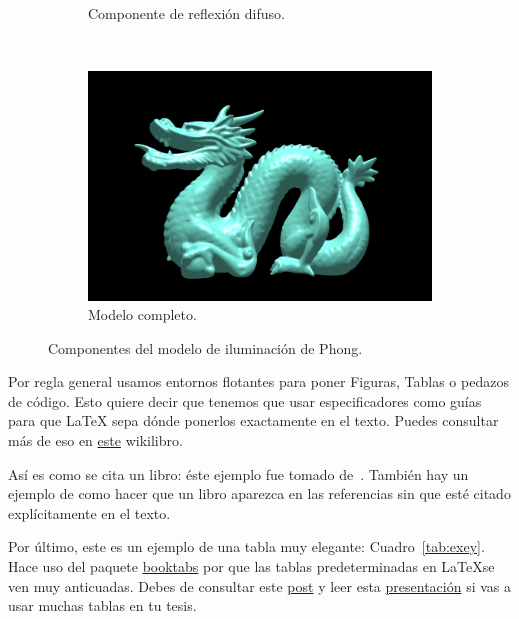 \begin{figure}[htp]
\begin{subfigure}[b]{0.45\textwidth}
   \caption{Componente de reflexión difuso.}
   \label{fig:2c}
 \end{subfigure}
~
 \begin{subfigure}[b]{0.45\textwidth}
   \includegraphics[width=\textwidth]{img/cap02/completo}
   \caption{Modelo completo.}
   \label{fig:2d}
 \end{subfigure}
 \caption[Modelo de iluminación de Phong]{Componentes del modelo de iluminación de Phong.}
 \label{fig:two}
\end{figure}

Por regla general usamos entornos flotantes para poner Figuras, Tablas o pedazos de código.
Esto quiere decir que tenemos que usar especificadores como guías para que \LaTeX{} sepa dónde ponerlos exactamente en el texto.
Puedes consultar más de eso en \href{https://en.wikibooks.org/wiki/LaTeX/Floats,_Figures_and_Captions}{este} wikilibro.

Así es como se cita un libro: éste ejemplo fue tomado de~\cite{Gonzalez:ImagenesDigitales}.
También hay un ejemplo de como hacer que un libro aparezca en las referencias sin que esté citado explícitamente en el texto.

Por último, este es un ejemplo de una tabla muy elegante: Cuadro~\ref{tab:exey}.
Hace uso del paquete \href{https://ctan.org/pkg/booktabs}{booktabs} por que las tablas predeterminadas en \LaTeX se ven muy anticuadas.
Debes de consultar este \href{https://jdhao.github.io/2019/08/27/latex_table_with_booktabs/}{post} y leer esta \href{https://people.inf.ethz.ch/markusp/teaching/guides/guide-tables.pdf}{presentación} si vas a usar muchas tablas en tu tesis.

